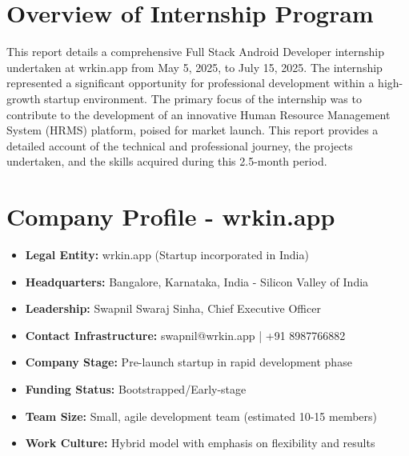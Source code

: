 \section{Overview of Internship Program}
This report details a comprehensive Full Stack Android Developer internship undertaken at wrkin.app from May 5, 2025, to July 15, 2025. The internship represented a significant opportunity for professional development within a high-growth startup environment. The primary focus of the internship was to contribute to the development of an innovative Human Resource Management System (HRMS) platform, poised for market launch. This report provides a detailed account of the technical and professional journey, the projects undertaken, and the skills acquired during this 2.5-month period.

\section{Company Profile - wrkin.app}
\begin{itemize}
    \item \textbf{Legal Entity:} wrkin.app (Startup incorporated in India)
    \item \textbf{Headquarters:} Bangalore, Karnataka, India - Silicon Valley of India
    \item \textbf{Leadership:} Swapnil Swaraj Sinha, Chief Executive Officer
    \item \textbf{Contact Infrastructure:} swapnil@wrkin.app | +91 8987766882
    \item \textbf{Company Stage:} Pre-launch startup in rapid development phase
    \item \textbf{Funding Status:} Bootstrapped/Early-stage
    \item \textbf{Team Size:} Small, agile development team (estimated 10-15 members)
    \item \textbf{Work Culture:} Hybrid model with emphasis on flexibility and results
\end{itemize}

